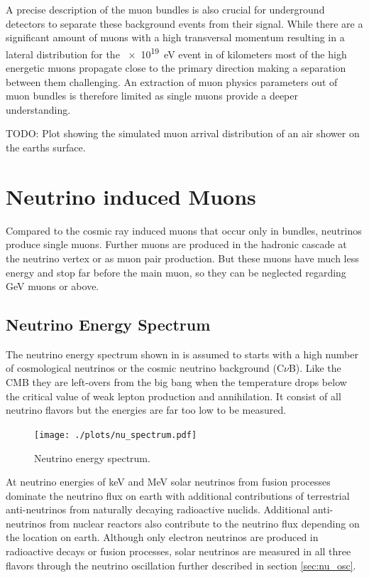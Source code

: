 A precise description of the muon bundles is also crucial for underground detectors to separate these background events from their signal.
While there are a significant amount of muons with a high transversal momentum resulting in a lateral distribution for the \SI{e19}{eV} event in  of kilometers \cite{Engel11EAS} most of the high energetic muons propagate close to the primary direction making a separation between them challenging.
An extraction of muon physics parameters out of muon bundles is therefore limited as single muons provide a deeper understanding.

TODO: Plot showing the simulated muon arrival distribution of an air shower on the earths surface.

%
% 
%
%

\section{Neutrino induced Muons}

Compared to the cosmic ray induced muons that occur only in bundles, neutrinos produce single muons.
Further muons are produced in the hadronic cascade at the neutrino vertex or as muon pair production.
But these muons have much less energy and stop far before the main muon, so they can be neglected regarding GeV muons or above.

\subsection{Neutrino Energy Spectrum}

The neutrino energy spectrum shown in  is assumed to starts with a high number of cosmological neutrinos or the cosmic neutrino background (C$\nu$B).
Like the CMB they are left-overs from the big bang when the temperature drops below the critical value of weak lepton production and annihilation.
It consist of all neutrino flavors but the energies are far too low to be measured.

\begin{figure}
    \centering
    \texttt{[image: ./plots/nu\_spectrum.pdf]}
    \caption{Neutrino energy spectrum. \cite{KatzSpiering12}}
    \label{fig:neutrino_spectrum}
\end{figure}

At neutrino energies of keV and MeV solar neutrinos from fusion processes dominate the neutrino flux on earth with additional contributions of terrestrial anti-neutrinos from naturally decaying radioactive nuclids.
Additional anti-neutrinos from nuclear reactors also contribute to the neutrino flux depending on the location on earth.
Although only electron neutrinos are produced in radioactive decays or fusion processes, solar neutrinos are measured in all three flavors through the neutrino oscillation further described in section \ref{sec:nu_osc}.

